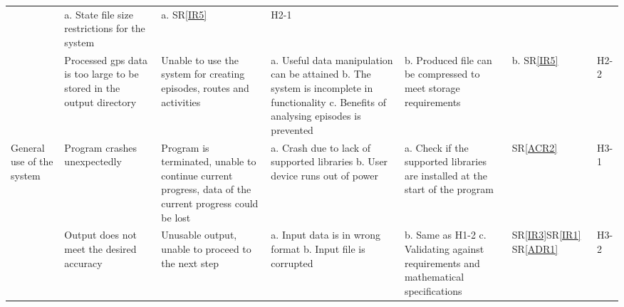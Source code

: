 \documentclass{article}
\begin{document}
\begin{landscape}
\begin{table}[H]
{\begin{tabular}{|p{1.8 in}|p{2.0 in}|p{2 in}|p{2 in}|p{2.3 in}|p{0.5 in}|p{0.5 in}|}
& a. State file size restrictions for the system \newline
& a. SR\ref{IR5} \newline 
& H2-1\\



& Processed gps data is too large to be stored in the output directory
& Unable to use the system for creating episodes, routes and activities
& a. Useful data manipulation can be attained\newline
  b. The system is incomplete in functionality\newline
  c. Benefits of analysing episodes is prevented \newline 
& b. Produced file can be compressed to meet storage requirements\newline
& b. SR\ref{IR5} \newline 
& H2-2 \\ \hline
 


\multirow{3}{1.8in}{General use of the system} 
& Program crashes unexpectedly
& Program is terminated, unable to continue current progress, data of the
current progress could be lost
& 
a. Crash due to lack of supported libraries\newline
b. User device runs out of power\newline
& 
a. Check if the supported libraries are installed at the start of the program
& SR\ref{ACR2}%
& H3-1\label{H3-1} \\


& Output does not meet the desired accuracy
& Unusable output, unable to proceed to the next step
&
a. Input data is in wrong format
b. Input file is corrupted
& 
b. Same as H1-2 \newline
c. Validating against requirements and mathematical specifications\newline
& SR\ref{IR3}\newline SR\ref{IR1} \newline SR\ref{ADR1}
& H3-2\label{H3-2}  \\





\end{tabular}}
\end{table}
\end{landscape}
\end{document}
